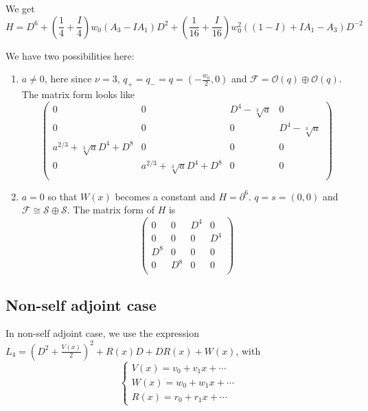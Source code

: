 \documentclass[11pt]{article}
\theoremstyle{definition}
\theoremstyle{plain}
\numberwithin{equation}{section}
\begin{document}
We get 
$$
H=D^6+(\frac{1}{4}+\frac{I}{4})w_0 (A_3-I A_1)D^2+(\frac{1}{16}+\frac{I}{16}) w_0^2 ((1-I)+I A_1-A_3)D^{-2}
$$

We have two possibilities here:
\begin{enumerate}
	\item $a\neq 0$, here since $\nu=3$, $q_+=q_-=q=(-\frac{w_0}{2},0)$ and $\mathcal{F}=\mathcal{O}(q)\oplus\mathcal{O}(q)$. The matrix form looks like 
	$$
	\left(
	\begin{array}{cccc}
		0 & 0 & D^4-\sqrt[3]{a} & 0 \\
		0 & 0 & 0 & D^4-\sqrt[3]{a} \\
		a^{2/3}+\sqrt[3]{a} D^4+D^8 & 0 & 0 & 0 \\
		0 & a^{2/3}+\sqrt[3]{a} D^4+D^8 & 0 & 0 \\
	\end{array}
	\right)
	$$
	\item $a=0$ so that $W(x)$ becomes a constant and $H=\partial^6$. $q=s=(0,0)$ and $\mathcal{F}\cong \mathcal{S}\oplus \mathcal{S}$. The matrix form of $H$ is 
	$$\left(
	\begin{array}{cccc}
		0 & 0 & D^4 & 0 \\
		0 & 0 & 0 & D^4 \\
		D^8 & 0 & 0 & 0 \\
		0 & D^8 & 0 & 0 \\
	\end{array}
	\right)$$
\end{enumerate}

\subsection{Non-self adjoint case}
\label{S:non-self_adj}


In non-self adjoint case, we use the expression  $L_4=(D^2+\frac{V(x)}{2})^2+R(x)D+DR(x)+W(x)$, with 
$$
\begin{cases}
	V(x)=v_0+v_1x+\cdots
	\\W(x)=w_0+w_1x+\cdots
	\\R(x)=r_0+r_1x+\cdots
\end{cases}
$$
\end{document}
